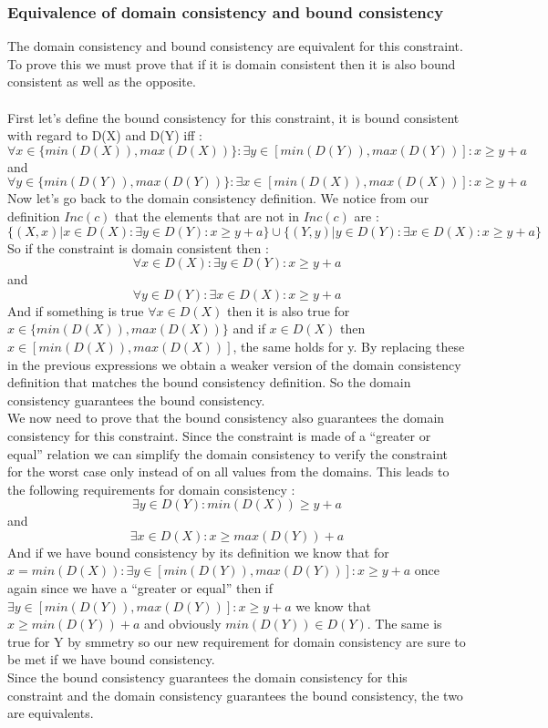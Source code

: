 \documentclass{eplDoc}
\begin{document}
\subsubsection{Equivalence of domain consistency and bound consistency}
The domain consistency and bound consistency are equivalent for this constraint. To prove this we must prove that if it is domain consistent then it is also bound consistent as well as the opposite. \\ \\ 
First let's define the bound consistency for this constraint, it is bound consistent with regard to D(X) and D(Y) iff :
$$\forall x \in \{ min(D(X)), max(D(X))\} : \exists y \in [min(D(Y)), max(D(Y))] : x \geq y+a$$ and
$$\forall y \in \{ min(D(Y)), max(D(Y))\} : \exists x \in [min(D(X)), max(D(X))] : x \geq y+a$$
Now let's go back to the domain consistency definition. We notice from our definition $Inc(c)$ that the elements that are not in $Inc(c)$ are : 
$$\{(X, x)|x \in D(X) : \exists y \in D(Y) : x \geq y+a\} \cup \{(Y, y)|y \in D(Y) : \exists x \in D(X) : x \geq y+a\}$$
So if the constraint is domain consistent then :
$$\forall x \in D(X) : \exists y \in D(Y) : x \geq y+a$$ and
$$\forall y \in D(Y) : \exists x \in D(X) : x \geq y+a$$
And if something is true $\forall x\in D(X)$ then it is also true for $x \in \{ min(D(X)), max(D(X))\}$ and if $x \in D(X)$ then $x \in [min(D(X)), max(D(X))]$, the same holds for y. By replacing these in the previous expressions we obtain a weaker version of the domain consistency definition that matches the bound consistency definition. So the domain consistency guarantees the bound consistency. \\ 
We now need to prove that the bound consistency also guarantees the domain consistency for this constraint. Since the constraint is made of a "`greater or equal"' relation we can simplify the domain consistency to verify the constraint for the worst case only instead of on all values from the domains. This leads to the following requirements for domain consistency : 
$$ \exists y \in D(Y) : min(D(X)) \geq y+a$$ and
$$ \exists x \in D(X) : x \geq max(D(Y))+a$$
And if we have bound consistency by its definition we know that for $x=min(D(X)) : \exists y \in [min(D(Y)), max(D(Y))] : x \geq y+a$ once again since we have a "`greater or equal"' then if $\exists y \in [min(D(Y)), max(D(Y))]: x \geq y+a$ we know that $x \geq min(D(Y))+a$ and obviously $min(D(Y))\in D(Y)$. The same is true for Y by smmetry so our new requirement for domain consistency are sure to be met if we have bound consistency. \\ 
Since the bound consistency guarantees the domain consistency for this constraint and the domain consistency guarantees the bound consistency, the two are equivalents.  
\end{document}
